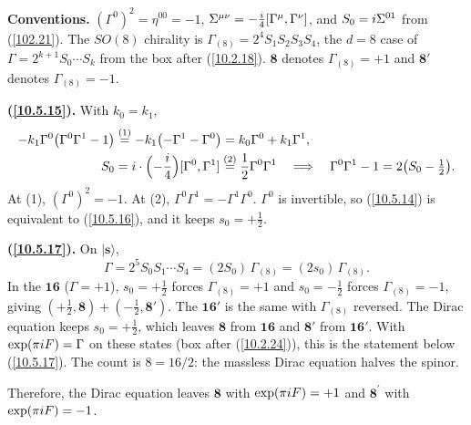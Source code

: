 	\begin{tcolorbox}[breakable]
		\begin{remark}
			\textbf{Conventions.} $(\Gamma^0)^{2}=\eta^{00}=-1$, $\Sigma^{\mu\nu}=-\tfrac{i}{4}[\Gamma^\mu,\Gamma^\nu]$, and $S_0=i\Sigma^{01}$ from (\ref{102.21}). The $SO(8)$ chirality is $\Gamma_{(8)}=2^{4}S_1S_2S_3S_4$, the $d=8$ case of $\Gamma=2^{k+1}S_0\cdots S_k$ from the box after (\ref{10.2.18}). $\mathbf8$ denotes $\Gamma_{(8)}=+1$ and $\mathbf8'$ denotes $\Gamma_{(8)}=-1$.

			\textbf{(\ref{10.5.15}).} With $k_0=k_1$,
			\begin{align*}
				-k_1\Gamma^0\bigl(\Gamma^0\Gamma^1-1\bigr)&\overset{(1)}{=}-k_1\bigl(-\Gamma^1-\Gamma^0\bigr)=k_0\Gamma^0+k_1\Gamma^1,\\
				S_0&=i\cdot\Bigl(-\frac{i}{4}\Bigr)[\Gamma^0,\Gamma^1]\overset{(2)}{=}\frac12\Gamma^0\Gamma^1
				\quad\Longrightarrow\quad \Gamma^0\Gamma^1-1=2\bigl(S_0-\tfrac12\bigr) .
			\end{align*}
			At (1), $(\Gamma^0)^2=-1$. At (2), $\Gamma^0\Gamma^1=-\Gamma^1\Gamma^0$. $\Gamma^0$ is invertible, so (\ref{10.5.14}) is equivalent to (\ref{10.5.16}), and it keeps $s_0=+\tfrac12$.

			\textbf{(\ref{10.5.17}).} On $\lvert\mathbf s\rangle$,
			\begin{equation*}
				\Gamma=2^{5}S_0S_1\cdots S_4=(2S_0)\,\Gamma_{(8)}=(2s_0)\,\Gamma_{(8)} .
			\end{equation*}
			In the $\mathbf{16}$ ($\Gamma=+1$), $s_0=+\tfrac12$ forces $\Gamma_{(8)}=+1$ and $s_0=-\tfrac12$ forces $\Gamma_{(8)}=-1$, giving $(+\tfrac12,\mathbf8)+(-\tfrac12,\mathbf8')$. The $\mathbf{16}'$ is the same with $\Gamma_{(8)}$ reversed. The Dirac equation keeps $s_0=+\tfrac12$, which leaves $\mathbf8$ from $\mathbf{16}$ and $\mathbf8'$ from $\mathbf{16}'$. With $\exp(\pi i F)=\Gamma$ on these states (box after (\ref{10.2.24})), this is the statement below (\ref{10.5.17}). The count is $8=16/2$: the massless Dirac equation halves the spinor.
		\end{remark}
	\end{tcolorbox}
	Therefore, the Dirac equation leaves $\mathbf{8}$ with $\exp(\pi i F)=+1$ and $\mathbf{8}^{\prime}$ with $\exp(\pi i F)=-1$.
	
